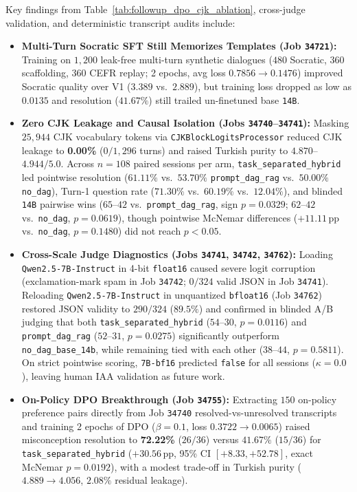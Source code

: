 \documentclass[a4paper,12pt]{report}
\begin{document}
Key findings from Table~\ref{tab:followup_dpo_cjk_ablation}, cross-judge validation, and deterministic transcript audits include:
\begin{itemize}
    \item \textbf{Multi-Turn Socratic SFT Still Memorizes Templates (Job \texttt{34721}):} Training on $1,200$ leak-free multi-turn synthetic dialogues ($480$ Socratic, $360$ scaffolding, $360$ CEFR replay; 2 epochs, avg loss $0.7856 \to 0.1476$) improved Socratic quality over V1 ($3.389$ vs.\ $2.889$), but training loss dropped as low as $0.0135$ and resolution ($41.67\%$) still trailed un-finetuned base \texttt{14B}.
    \item \textbf{Zero CJK Leakage and Causal Isolation (Jobs \texttt{34740}--\texttt{34741}):} Masking $25,944$ CJK vocabulary tokens via \texttt{CJKBlockLogitsProcessor} reduced CJK leakage to \textbf{0.00\%} ($0/1,296$ turns) and raised Turkish purity to $4.870$--$4.944/5.0$. Across $n=108$ paired sessions per arm, \texttt{task\_separated\_hybrid} led pointwise resolution ($61.11\%$ vs.\ $53.70\%$ \texttt{prompt\_dag\_rag} vs.\ $50.00\%$ \texttt{no\_dag}), Turn-1 question rate ($71.30\%$ vs.\ $60.19\%$ vs.\ $12.04\%$), and blinded \texttt{14B} pairwise wins ($65$--$42$ vs.\ \texttt{prompt\_dag\_rag}, sign $p=0.0329$; $62$--$42$ vs.\ \texttt{no\_dag}, $p=0.0619$), though pointwise McNemar differences ($+11.11$\,pp vs.\ \texttt{no\_dag}, $p=0.1480$) did not reach $p < 0.05$.
    \item \textbf{Cross-Scale Judge Diagnostics (Jobs \texttt{34741}, \texttt{34742}, \texttt{34762}):} Loading \texttt{Qwen2.5-7B-Instruct} in 4-bit \texttt{float16} caused severe logit corruption (exclamation-mark spam in Job \texttt{34742}; $0/324$ valid JSON in Job \texttt{34741}). Reloading \texttt{Qwen2.5-7B-Instruct} in unquantized \texttt{bfloat16} (Job \texttt{34762}) restored JSON validity to $290/324$ ($89.5\%$) and confirmed in blinded A/B judging that both \texttt{task\_separated\_hybrid} ($54$--$30$, $p=0.0116$) and \texttt{prompt\_dag\_rag} ($52$--$31$, $p=0.0275$) significantly outperform \texttt{no\_dag\_base\_14b}, while remaining tied with each other ($38$--$44$, $p=0.5811$). On strict pointwise scoring, \texttt{7B-bf16} predicted \texttt{false} for all sessions ($\kappa = 0.0$), leaving human IAA validation as future work.
    \item \textbf{On-Policy DPO Breakthrough (Job \texttt{34755}):} Extracting $150$ on-policy preference pairs directly from Job \texttt{34740} resolved-vs-unresolved transcripts and training 2 epochs of DPO ($\beta=0.1$, loss $0.3722 \to 0.0065$) raised misconception resolution to \textbf{72.22\%} ($26/36$) versus $41.67\%$ ($15/36$) for \texttt{task\_separated\_hybrid} ($+30.56$\,pp, 95\% CI $[+8.33, +52.78]$, exact McNemar $p=0.0192$), with a modest trade-off in Turkish purity ($4.889 \to 4.056$, $2.08\%$ residual leakage).
\end{itemize}
\end{document}
